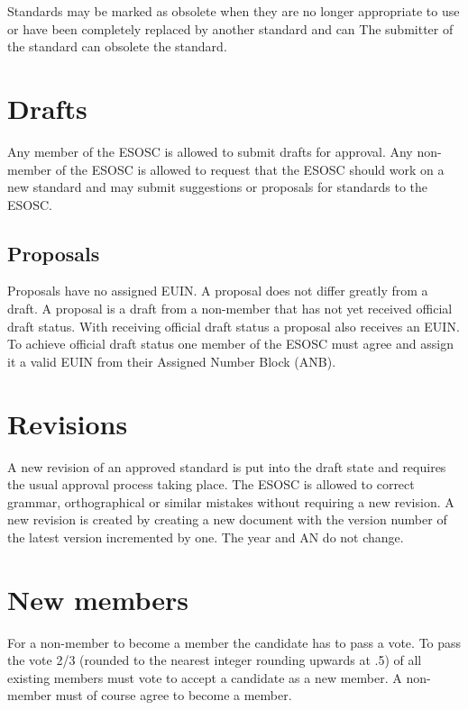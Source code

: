 \documentclass[paper=a4, fontsize=11pt]{scrartcl}
\numberwithin{equation}{section}
\numberwithin{figure}{section}
\numberwithin{table}{section}
\begin{document}
Standards may be marked as obsolete when they are no longer
appropriate to use or have been completely replaced by another standard and can
The submitter of the standard can obsolete the standard. 


\section{Drafts}

Any member of the ESOSC is allowed to submit drafts for approval.
Any non-member of the ESOSC is allowed to request that the ESOSC should work
on a new standard and may submit suggestions or proposals for standards to
the ESOSC.  

\subsection{Proposals}

Proposals have no assigned EUIN. A proposal does not differ greatly from a draft.
A proposal is a draft from a non-member that has not yet received official draft
status. With receiving official draft status a proposal also receives an EUIN. \\


To achieve official draft status one member of the ESOSC must agree and assign
it a valid EUIN from their Assigned Number Block (ANB). 


\section{Revisions}

A new revision of an approved standard is put into the draft state and
requires the usual approval process taking place. The ESOSC is allowed to correct grammar,
orthographical or similar mistakes without requiring a new revision. A new revision
is created by creating a new document with the version number of the latest 
version incremented by one. The year and AN do not change. 


\section{New members}

For a non-member to become a member the candidate has to pass a vote. To pass the
vote 2/3 (rounded to the nearest integer rounding upwards at .5) of all existing 
members must vote to accept a candidate as a new member. A non-member must of
course agree to become a member. 
\end{document}
